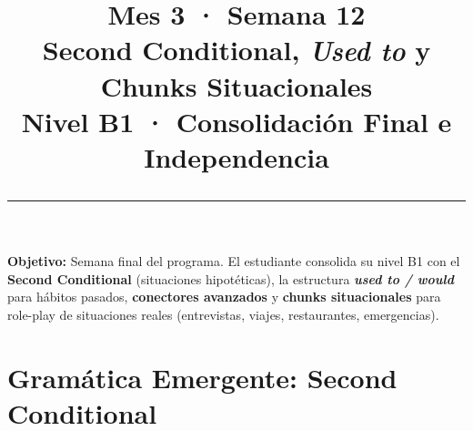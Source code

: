 \documentclass[12pt,a4paper]{article}
\title{%
  \vspace{-1cm}
  {\Huge\bfseries\textcolor{mes3}{Mes 3 · Semana 12}}\\[0.3cm]
  {\Large Second Conditional, \textit{Used to} y Chunks Situacionales}\\[0.2cm]
  {\large\color{grissuave} Nivel B1 · Consolidación Final e Independencia}\\[0.5cm]
  \rule{\textwidth}{1.5pt}
}
\author{}
\date{}
\begin{document}
\maketitle
\thispagestyle{empty}

\begin{cajanivel}
\textbf{Objetivo:} Semana final del programa. El estudiante consolida su nivel B1 con el \textbf{Second Conditional} (situaciones hipotéticas), la estructura \textbf{\textit{used to / would}} para hábitos pasados, \textbf{conectores avanzados} y \textbf{chunks situacionales} para role-play de situaciones reales (entrevistas, viajes, restaurantes, emergencias).
\end{cajanivel}

\section{Gramática Emergente: Second Conditional}
\end{document}
